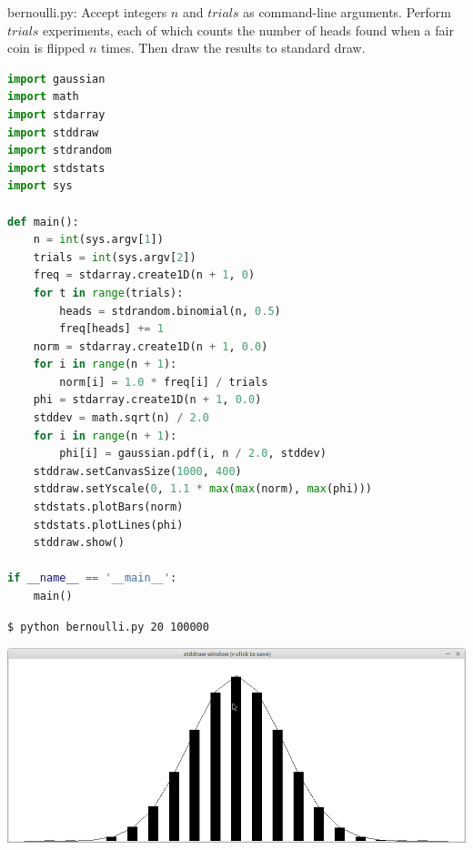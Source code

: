 \documentclass[8pt,a4paper,compress,handout]{beamer}
\begin{document}
\begin{frame}[fragile]
\begin{framed}
\tiny bernoulli.py: Accept integers $n$ and $trials$ as command-line arguments. Perform $trials$ experiments, each of which counts the number of heads found when a fair coin is flipped $n$ times. Then draw the results to standard draw. 
\end{framed}

\begin{lstlisting}[language=Python]
import gaussian
import math
import stdarray
import stddraw
import stdrandom
import stdstats
import sys

def main():
    n = int(sys.argv[1])
    trials = int(sys.argv[2])
    freq = stdarray.create1D(n + 1, 0)
    for t in range(trials):
        heads = stdrandom.binomial(n, 0.5)
        freq[heads] += 1
    norm = stdarray.create1D(n + 1, 0.0)
    for i in range(n + 1):
        norm[i] = 1.0 * freq[i] / trials
    phi = stdarray.create1D(n + 1, 0.0)
    stddev = math.sqrt(n) / 2.0
    for i in range(n + 1):
        phi[i] = gaussian.pdf(i, n / 2.0, stddev)
    stddraw.setCanvasSize(1000, 400)
    stddraw.setYscale(0, 1.1 * max(max(norm), max(phi)))
    stdstats.plotBars(norm)
    stdstats.plotLines(phi)
    stddraw.show()

if __name__ == '__main__':
    main()
\end{lstlisting}
\end{frame}

\begin{frame}[fragile]
\begin{minipage}{160pt}
\begin{lstlisting}[language={}]
$ python bernoulli.py 20 100000
\end{lstlisting}
\end{minipage}%
\begin{minipage}{140pt}
\hfill \includegraphics[scale=0.12]{figures/bernoulli.png}
\end{minipage}
\end{frame}
\end{document}

